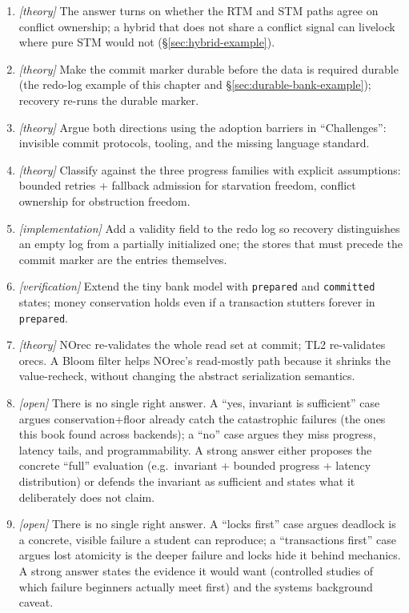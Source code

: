 \begin{enumerate}
    \item \emph{[theory]} The answer turns on whether the RTM and STM paths
          agree on conflict ownership; a hybrid that does not share a
          conflict signal can livelock where pure STM would not
          (\S\ref{sec:hybrid-example}).
    \item \emph{[theory]} Make the commit marker durable before the data is
          required durable (the redo-log example of this chapter and
          \S\ref{sec:durable-bank-example}); recovery re-runs the durable
          marker.
    \item \emph{[theory]} Argue both directions using the adoption barriers
          in ``Challenges'': invisible commit protocols, tooling, and the
          missing language standard.
    \item \emph{[theory]} Classify against the three progress families with
          explicit assumptions: bounded retries + fallback admission for
          starvation freedom, conflict ownership for obstruction freedom.
    \item \emph{[implementation]} Add a validity field to the redo log so
          recovery distinguishes an empty log from a partially initialized
          one; the stores that must precede the commit marker are the
          entries themselves.
    \item \emph{[verification]} Extend the tiny bank model with
          \texttt{prepared} and \texttt{committed} states; money
          conservation holds even if a transaction stutters forever in
          \texttt{prepared}.
    \item \emph{[theory]} NOrec re-validates the whole read set at commit;
          TL2 re-validates orecs.  A Bloom filter helps NOrec's read-mostly
          path because it shrinks the value-recheck, without changing the
          abstract serialization semantics.
    \item \emph{[open]} There is no single right answer.  A ``yes, invariant
          is sufficient'' case argues conservation+floor already catch the
          catastrophic failures (the ones this book found across
          backends); a ``no'' case argues they miss progress, latency
          tails, and programmability.  A strong answer either proposes the
          concrete ``full'' evaluation (e.g.\ invariant + bounded
          progress + latency distribution) or defends the invariant as
          sufficient and states what it deliberately does not claim.
    \item \emph{[open]} There is no single right answer.  A ``locks first''
          case argues deadlock is a concrete, visible failure a student can
          reproduce; a ``transactions first'' case argues lost atomicity is
          the deeper failure and locks hide it behind mechanics.  A strong
          answer states the evidence it would want (controlled studies of
          which failure beginners actually meet first) and the systems
          background caveat.
\end{enumerate}
